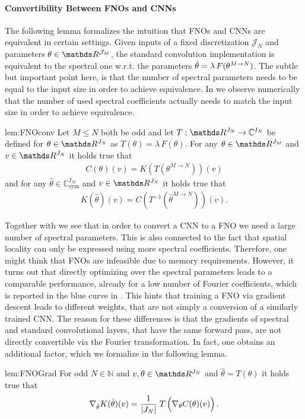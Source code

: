 \paragraph{Convertibility Between FNOs and CNNs}
%
%
The following lemma formalizes the intuition that FNOs and CNNs are equivalent in certain settings. Given inputs of a fixed discretization $\mathcal{J}_N$ and parameters $\param\in\R^{\mathcal{J}_M}$, the standard convolution implementation is equivalent to the spectral one w.r.t. the parameters $\hat{\theta} = \lambda\, F(\theta^{M\to N})$. The subtle but important point here, is that the number of spectral parameters needs to be equal to the input size in order to achieve equivalence. In \cite[Fig.3]{kabri2023resolution} we observe numerically that the number of used spectral coefficients actually needs to match the input size in order to achieve equivalence.
%
%
\begin{lemma}{\cite[Lem. 3]{kabri2023resolution}}{lem:FNOconv}
	Let $M \leq N$ both be odd and let $T: \R^{J_N} \rightarrow \mathbb{C}^{I_N}$ be defined for $\theta \in \R^{J_N}$ as
	$T(\theta) = \lambda \, F(\theta)$.
	For any $\theta \in \R^{J_M}$ and $v \in \R^{J_N}$ it holds true that
	\begin{align*}
		C(\theta)(v) = K(T(\theta^{M\rightarrow N}))(v)
	\end{align*}
	and for any $\hat{\theta} \in \mathbb{C}^{I_M}_{\text{sym}}$ and $v \in \R^{J_N}$ it holds true that
	\begin{align*}
		K(\hat{\theta})(v) = C(T^{-1}(\hat{\theta}^{M\rightarrow N}))(v).
	\end{align*}
\end{lemma}
%
%
\noindent%
Together with \cite[Fig. 3]{kabri2023resolution} we see that in order to convert a CNN to a FNO we need a large number of spectral parameters. This is also connected to the fact that spatial locality can only be expressed using more spectral coefficients. Therefore, one might think that FNOs are infeasible due to memory requirements. However, it turns out that directly optimizing over the spectral parameters leads to a comparable performance, already for a low number of Fourier coefficients, which is reported in the blue curve in \cite[Fig. 3]{kabri2023resolution}. This hints that training a FNO via gradient descent leads to different weights, that are not simply a conversion of a similarly trained CNN. The reason for these differences is that the gradients of spectral and standard convolutional layers, that have the same forward pass, are not directly convertible via the Fourier transformation. In fact, one obtains an additional factor, which we formalize in the following lemma.
%
%
\begin{lemma}{\cite[Lem. 4]{kabri2023resolution}}{lem:FNOGrad}
For odd $N \in \mathbb{N}$ and $v, \theta \in \R^{J_N}$ and $\hat{\theta} = T(\theta)$ it holds true that
\begin{align*}
	\nabla_{\hat{\theta}} K(\hat{\theta})(v) = \frac{1}{|J_N|}\; T \left( \vphantom{\hat{\theta}} \nabla_{\theta}C(\theta)(v) \right). 
\end{align*}
\end{lemma}
%
%
